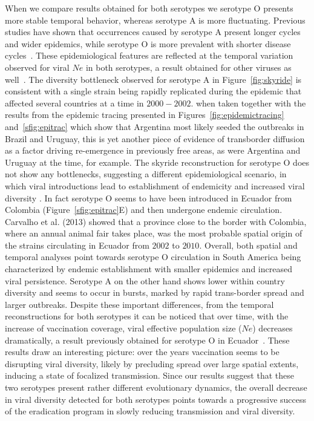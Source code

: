 \documentclass[10pt]{article}
\begin{document}

When we compare results obtained for both serotypes we serotype O presents more stable temporal behavior, whereas serotype A is more fluctuating.
Previous studies have shown that occurrences caused by serotype A present longer cycles and wider epidemics, while serotype O is more prevalent with shorter disease cycles~\cite{colombiatime}.
These epidemiological features are reflected at the temporal variation observed for viral $Ne$ in both serotypes, a result obtained for other viruses as well~\cite{Bennett2010,Pybus2003}. 
The diversity bottleneck observed for serotype A in Figure~\ref{fig:skyride} is consistent with a single strain being rapidly replicated during the epidemic that affected several countries at a time in $2000-2002$.
when taken together with the results from the epidemic tracing presented in Figures~\ref{fig:epidemictracing} and~\ref{sfig:epitrac} which show that Argentina most likely seeded the outbreaks in Brazil and Uruguay, this is yet another piece of evidence of transborder diffusion as a factor driving re-emergence in previously free areas, as were Argentina and Uruguay at the time, for example.
The skyride reconstruction for serotype O does not show any bottlenecks, suggesting a different epidemiological scenario, in which viral introductions lead to establishment of endemicity and increased viral diversity .
In fact serotype O seems to have been introduced in Ecuador from Colombia (Figure~\ref{sfig:epitrac}E) and then undergone endemic circulation.
Carvalho et al. (2013) showed that a province close to the border with Colombia, where an annual animal fair takes place, was the most probable spatial origin of the strains circulating in Ecuador from $2002$ to $2010$.
Overall, both spatial and temporal analyses point towards serotype O circulation in South America being characterized by endemic establishment with smaller epidemics and increased viral persistence. 
Serotype A on the other hand shows lower within country diversity and seems to occur in bursts, marked by rapid trans-border spread and larger outbreaks. 
Despite these important differences, from the temporal reconstructions for both serotypes it can be noticed that over time, with the increase of vaccination coverage, viral effective population size ($Ne$) decreases dramatically, a result previously obtained for serotype O in Ecuador~\cite{Carvalho2013}.
These results draw an interesting picture: over the years vaccination seems to be disrupting viral diversity, likely by precluding spread over large spatial extents, inducing a state of focalized transmission.
Since our results suggest that these two serotypes present rather different evolutionary dynamics, the overall decrease in viral diversity detected for both serotypes points towards a progressive success of the eradication program in slowly reducing transmission and viral diversity.
\end{document}
